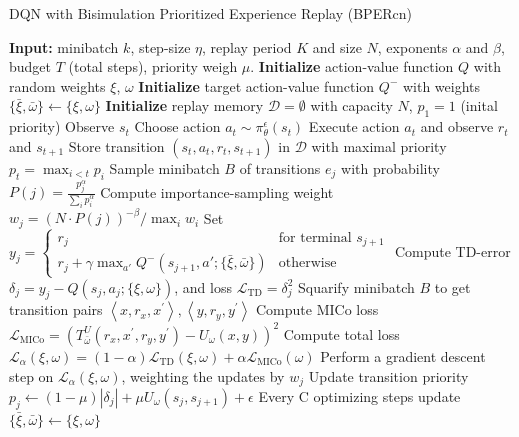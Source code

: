 \begin{algorithm}[h]
\caption{DQN with Bisimulation Prioritized Experience Replay (BPERcn)}
\label{algorithm:dqn_bper}
\begin{algorithmic}[1]
\State \textbf{Input:} minibatch $k$, step-size $\eta$, replay period $K$ and size $N$, exponents $\alpha$ and $\beta$, budget $T$ (total steps), priority weigh $\mu$.
\State \textbf{Initialize} action-value function $Q$ with random weights $\xi$, $\omega$
\State \textbf{Initialize} target action-value function $Q^-$ with weights $\{\bar{\xi},\bar{\omega}\} \leftarrow \{\xi, \omega\}$
\State \textbf{Initialize} replay memory $\mathcal{D} = \emptyset$ with capacity $N$, $p_1 = 1$ (inital priority) %
    \State Observe $s_t$
    \State Choose action $a_t \sim \pi^\epsilon_\theta(s_t)$
    \State Execute action $a_t$ and observe $r_t$ and $s_{t+1}$
    \State Store transition $(s_t, a_t, r_t, s_{t+1})$ in $\mathcal{D}$ with maximal priority $p_t = \max_{i < t} p_i$
        \State Sample minibatch $B$ of transitions $e_j$ with probability $P(j) = \frac{p_j^\alpha}{\sum_i p_i^\alpha}$    
        \State Compute importance-sampling weight $w_j = \left( N \cdot P(j) \right)^{-\beta} / \max_i w_i$
        \State Set $y_j = 
        \begin{cases} 
            r_j & \text{for terminal } s_{j+1}\\
            r_j + \gamma \max_{a'} Q^-(s_{j+1}, a'; \{\bar{\xi},\bar{\omega}\}) & \text{otherwise}
        \end{cases}$
        \State Compute TD-error $\delta_j = y_j - Q(s_{j}, a_{j}; \{\xi, \omega\})$, and loss $\mathcal{L}_{\text{TD}} = \delta_j^2 $
        \State Squarify minibatch $B$ to get transition pairs $\left\langle x, r_x, x^{\prime}\right\rangle,\left\langle y, r_y, y^{\prime}\right\rangle$ 
        \State Compute MICo loss $\mathcal{L}_{\text{MICo}} = \left(T_{\bar{\omega}}^U\left(r_x, x^{\prime}, r_y, y^{\prime}\right)-U_\omega(x, y)\right)^2$
        \State Compute total loss $\mathcal{L}_\alpha(\xi, \omega) = (1 - \alpha) \mathcal{L}_{\text{TD}}(\xi, \omega) + \alpha \mathcal{L}_{\text{MICo}}(\omega)$
        \State Perform a gradient descent step on $\mathcal{L}_\alpha(\xi, \omega)$, weighting the updates by $w_j$
        \State Update transition priority $p_j \leftarrow (1 - \mu) |\delta_j| + \mu U_\omega(s_j,s_{j+1}) + \epsilon$
        \State Every C optimizing steps update $\{\bar{\xi},\bar{\omega}\} \leftarrow \{\xi, \omega\}$
    \EndIf
\EndFor
\end{algorithmic}
\end{algorithm}

